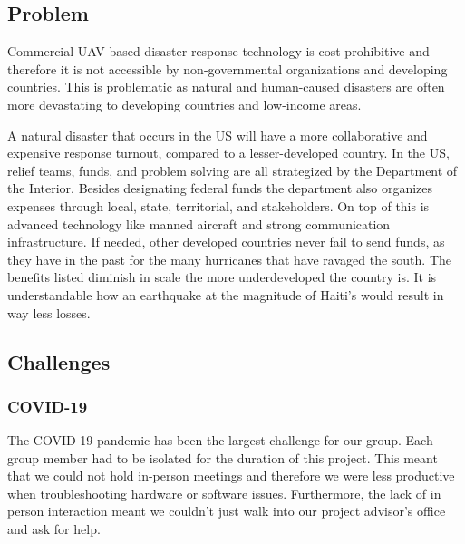 
\subsection{Problem}

Commercial UAV-based disaster response technology is cost prohibitive and therefore it is not accessible by non-governmental organizations and developing countries. This is problematic as natural and human-caused disasters are often more devastating to developing countries and low-income areas. 


A natural disaster that occurs in the US will have a more collaborative and expensive response turnout, compared to a lesser-developed country. In the US, relief teams, funds, and problem solving are all strategized by the Department of the Interior. Besides designating federal funds the department also organizes expenses through local, state, territorial, and stakeholders. On top of this is advanced technology like manned aircraft and strong communication infrastructure. If needed, other developed countries never fail to send funds, as they have in the past for the many hurricanes that have ravaged the south. The benefits listed diminish in scale the more underdeveloped the country is. It is understandable how an earthquake at the magnitude of Haiti’s would result in way less losses. 

\subsection{Challenges}
    \subsubsection{COVID-19}
The COVID-19 pandemic has been the largest challenge for our group. Each group member had to be isolated for the duration of this project. This meant that we could not hold in-person meetings and therefore we were less productive when troubleshooting hardware or software issues. Furthermore, the lack of in person interaction meant we couldn’t just walk into our project advisor’s office and ask for help. 

